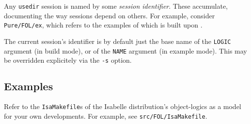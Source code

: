 \medskip Any \texttt{usedir} session is named by some \emph{session
  identifier}. These accumulate, documenting the way sessions depend
on others. For example, consider \texttt{Pure/FOL/ex}, which refers to
the examples of {\FOL} which is built upon {\Pure}.

The current session's identifier is by default just the base name of
the \texttt{LOGIC} argument (in build mode), or of the \texttt{NAME}
argument (in example mode). This may be overridden explicitely via the
\texttt{-s} option.


\subsection*{Examples}

Refer to the \texttt{IsaMakefile}s of the Isabelle distribution's
object-logics as a model for your own developments.  For example, see
\texttt{src/FOL/IsaMakefile}.


